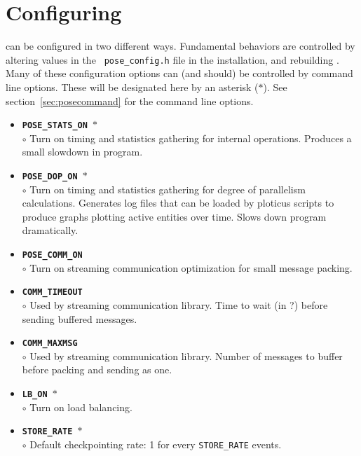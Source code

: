 \section{Configuring \pose{}}

\pose{} can be configured in two different ways.  Fundamental
behaviors are controlled by altering values in the {\tt
pose\_config.h} file in the \pose{} installation, and rebuilding
\pose{}.  Many of these configuration options can (and should) be
controlled by command line options.  These will be designated here by
an asterisk ($*$).  See section~\ref{sec:posecommand} for the command line
options.  

\begin{itemize}
\item {\tt {\bf POSE\_STATS\_ON $*$}}\\
	$\circ$ Turn on timing and statistics gathering for internal \pose{}
	operations.  Produces a small slowdown in program.\\
\item {\tt {\bf POSE\_DOP\_ON $*$}}\\
	$\circ$ Turn on timing and statistics gathering for degree of parallelism calculations.  Generates log files that can be loaded by ploticus scripts to produce graphs plotting active entities over time.  Slows down program dramatically.\\
\item {\tt {\bf POSE\_COMM\_ON}}\\
	$\circ$ Turn on streaming communication optimization for small message packing.\\
\item {\tt {\bf COMM\_TIMEOUT}}\\
	$\circ$ Used by streaming communication library. Time to wait (in ?) before sending buffered messages.\\
\item {\tt {\bf COMM\_MAXMSG}}\\
	$\circ$ Used by streaming communication library.  Number of messages to buffer before packing and sending as one.\\
\item {\tt {\bf LB\_ON $*$}}\\
	$\circ$ Turn on \pose{} load balancing.\\
\item {\tt {\bf STORE\_RATE $*$}}\\
	$\circ$ Default checkpointing rate: 1 for every {\tt STORE\_RATE} events.\\

\end{itemize}
